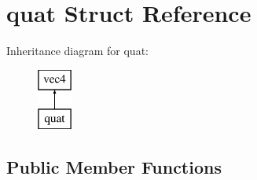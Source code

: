 \hypertarget{structquat}{}\section{quat Struct Reference}
\label{structquat}
Inheritance diagram for quat\+:\begin{figure}[H]
\begin{center}
\leavevmode
\includegraphics[height=2.000000cm]{structquat}
\end{center}
\end{figure}
\subsection*{Public Member Functions}
